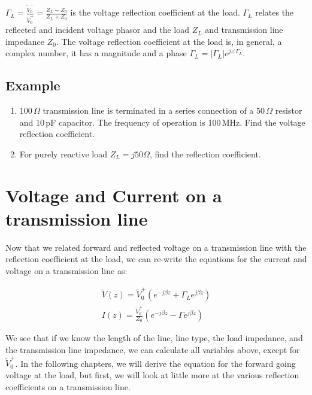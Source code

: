 \documentclass{ximera}
\begin{document}
\begin{definition}
$\Gamma_L=\frac{\tilde{V}_0^-}{\tilde{V}_0^+}= \frac{Z_L -Z_0}{Z_L +Z_0}$ is the voltage reflection
coefficient at the load. $\Gamma_L$ relates the reflected and incident voltage
phasor and the load $Z_L$ and transmission line impedance $Z_0$. The voltage reflection coefficient at the load is, in general, a complex number,
it has a magnitude and a phase $\Gamma_L=|\Gamma_L| e^{j \angle \Gamma_L}$.

\end{definition}

\subsection{Example}


 \begin{enumerate}
\item 100\,$\Omega$ transmission line is terminated in a series
connection of a 50\,$\Omega$ resistor and 10\,pF capacitor. The frequency
of operation is 100\,MHz. Find the voltage reflection coefficient.
\item For purely reactive load $Z_L=j 50 \Omega$, find the reflection
coefficient.
\end{enumerate}

\section{Voltage and Current on a transmission line}

Now that we related forward and reflected voltage on a transmission line with the reflection coefficient at the load, we can re-write the equations for the current and voltage on a transmission line as:

\begin{eqnarray}
\tilde{V}(z)= \tilde{V}_0^+ (e^{-j \beta z} + \Gamma_L  e^{j \beta z }  ) \label{eq:vtlfin} \\
I(z)=   \frac{\tilde{V}_0^+}{Z_0}  (e^{-j \beta z} - \Gamma  e^{j \beta z}  ) \label{eq:itlfin}
\end{eqnarray}

We see that if we know the length of the line, line type, the load impedance, and the transmission line impedance, we can calculate all variables above, except for  $\tilde{V}_0^+ $. In the following chapters, we will derive the equation for the forward going voltage at the load, but first, we will look at little more at the various reflection coefficients on a transmission line. 
\end{document}
